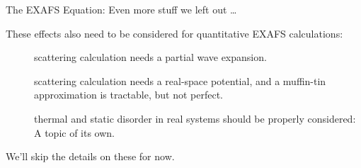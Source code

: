 \begin{slide}{The EXAFS Equation: Even more stuff we left out \ldots}

  These effects also need to be considered for  quantitative  EXAFS
  calculations:

    \vspace{2mm}

    \begin{minipage}{102mm}
    \begin{description}
    \item[] scattering calculation needs
      a partial wave expansion.

    \item[] scattering calculation needs
      a real-space potential, and a muffin-tin approximation is  tractable,
      but not perfect.


    \item[]  thermal and static disorder in real
      systems should be properly considered: A topic of its own.

    \end{description}

    \end{minipage}

    \vspace{3mm}

    We'll skip the details on these for now.

\vfill
\end{slide}

